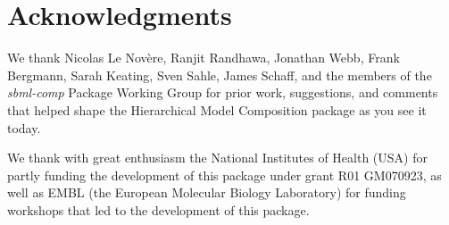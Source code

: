 
\section{Acknowledgments}

We thank Nicolas Le Nov\`{e}re, Ranjit Randhawa, Jonathan Webb, Frank
Bergmann, Sarah Keating, Sven Sahle, James Schaff, and the members of
the \emph{sbml-comp} Package Working Group for prior work, suggestions,
and comments that helped shape the Hierarchical Model Composition
package as you see it today.

We thank with great enthusiasm the National Institutes of Health (USA)
for partly funding the development of this package under grant R01
GM070923, as well as EMBL (the European Molecular Biology Laboratory)
for funding workshops that led to the development of this package.

